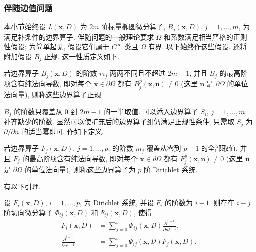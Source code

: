 \subsubsection{伴随边值问题}\label{subsec:adjoint-boundary-value-problem}

本小节始终设 $L(\bm{x},D)$ 为 $2m$ 阶标量椭圆微分算子, $B_j(\bm{x},D)$, $j=1,\ldots,m$, 为满足补条件的边界算子. 伴随问题的一般理论要求 $\Omega$ 和系数满足相当严格的正则性假设; 为简单起见, 假设它们属于 $C^\infty$ 类且 $\Omega$ 有界. 以下始终作这些假设. 还将附加假设 $B_j$ 正规. 这一性质定义如下.

\begin{Definition}
\label{def:normal-boundary-operators}
若边界算子 $B_j(\bm{x},D)$ 的阶数 $m_j$ 两两不同且不超过 $2m-1$, 并且 $B_j$ 的最高阶项含有纯法向导数, 即对每个 $\bm{x}\in\partial\Omega$ 都有 $B_j^p(\bm{x},\bm{n})\ne0$ (这里 $\bm{n}$ 是 $\partial\Omega$ 的单位法向量), 则称这些边界算子正规.
\end{Definition}

$B_j$ 的阶数只覆盖从 $0$ 到 $2m-1$ 的一半取值. 可以添入边界算子 $S_j$, $j=1,\ldots,m$, 补齐缺少的阶数. 显然可以使扩充后的边界算子组仍满足正规性条件; 只需取 $S_j$ 为 $\partial/\partial n$ 的适当幂即可. 作如下定义.

\begin{Definition}
\label{def:dirichlet-boundary-system}
若边界算子 $F_j(\bm{x},D)$, $j=1,\ldots,p$, 的阶数 $m_j$ 覆盖从零到 $p-1$ 的全部取值, 并且 $F_j$ 的最高阶项含有纯法向导数, 即对每个 $\bm{x}\in\partial\Omega$ 都有 $F_j^p(\bm{x},\bm{n})\ne0$ (这里 $\bm{n}$ 是 $\partial\Omega$ 的单位法向量), 则称这些边界算子为 $p$ 阶 Dirichlet 系统.
\end{Definition}

有以下引理.

\begin{Lemma}
\label{lem:dirichlet-system-tangential-triangular-reduction}
设 $F_i(\bm{x},D)$, $i=1,\ldots,p$, 为 Dirichlet 系统, 并设 $F_i$ 的阶数为 $i-1$. 则存在 $i-j$ 阶切向微分算子 $\Phi_{ij}(\bm{x},D)$ 和 $\Psi_{ij}(\bm{x},D)$, 使得
\begin{equation}\label{eq:dirichlet-system-tangential-triangular-reduction}
\begin{aligned}
F_i(\bm{x},D)&=\sum_{j=0}^i\Phi_{ij}(\bm{x},D)\frac{\partial^{j-1}}{\partial n^{j-1}},\\
\frac{\partial^{i-1}}{\partial n^{i-1}}&=\sum_{j=0}^i\Psi_{ij}(\bm{x},D)F_j(\bm{x},D).
\end{aligned}
\end{equation}

\end{Lemma}

